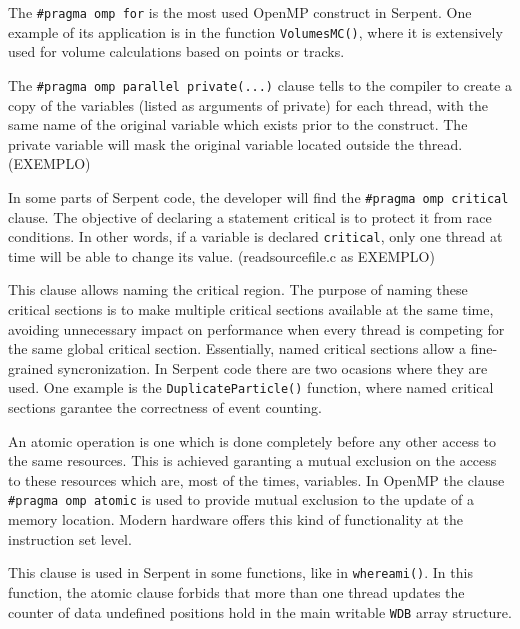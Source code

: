 \documentclass[twoside,a4paper,12pt,english]{anstrans}
\begin{document}

The \texttt{\#pragma omp for} is the most used OpenMP construct in Serpent. One example of its application
is in the function \texttt{VolumesMC()}, where it is extensively used for volume calculations based
on points or tracks.

The \texttt{\#pragma omp parallel private(...)} clause tells to the compiler to create
a copy of the variables (listed as arguments of private) for each thread, with the same name
of the original variable which exists prior to the construct. The private variable
will mask the original variable located outside the thread.  (EXEMPLO)

In some parts of Serpent code, the developer will find the \texttt{\#pragma omp critical}
clause. The objective of declaring a statement critical is to protect it from race conditions.
In other words, if a variable is declared \texttt{critical}, only one thread at time will
be able to change its value. (readsourcefile.c as EXEMPLO)

This clause allows naming the critical region. The purpose of naming these critical sections is
to make multiple critical sections available at the same time, avoiding unnecessary impact
on performance when every thread is competing for the same global critical section. Essentially,
named critical sections allow a fine-grained syncronization. In Serpent code there are two ocasions
where they are used. One example is the \texttt{DuplicateParticle()} function, where named critical
sections garantee the correctness of event counting.

An atomic operation is one which is
done completely before any other access to the same resources. This is achieved garanting
a mutual exclusion on the access to these resources which are, most of the times, variables. In
OpenMP the clause \texttt{\#pragma omp atomic} is used to provide mutual exclusion
to the update of a memory location. Modern hardware \cite{TimMattson} offers this
kind of functionality at the instruction set level. 

This clause is used in Serpent in some functions, like in \texttt{whereami()}.
In this function, the atomic clause forbids that more than one thread updates the
counter of data undefined positions hold in the main writable \texttt{WDB} array
structure.
\end{document}
